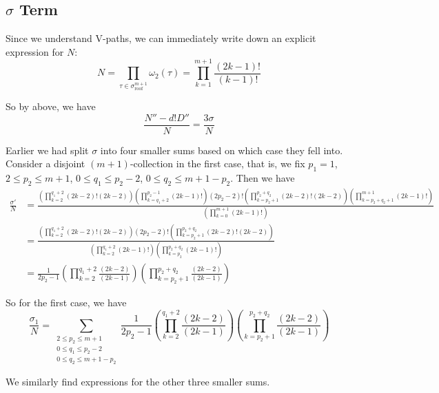 \documentclass[11pt]{article}
\theoremstyle{definition}
\theoremstyle{definition}
\theoremstyle{plain}
\theoremstyle{plain}
\theoremstyle{plain}
\theoremstyle{definition}
\begin{document}
\subsection{$\sigma$ Term}

Since we understand V-paths, we can immediately write down an explicit expression for $N$:
\begin{equation*}
N = \prod\limits_{\tau\in\sigma_{\text{roof}}^{m+1}}\omega_2(\tau) = \prod\limits_{k=1}^{m+1}\frac{(2k-1)!}{(k-1)!}
\end{equation*}

So by above, we have
\begin{equation*}
\frac{N''-d!D''}{N} = \frac{3\sigma}{N}
\end{equation*}

Earlier we had split $\sigma$ into four smaller sums based on which case they fell into. Consider a disjoint $(m+1)$-collection in the first case, that is, we fix $p_1 = 1$, $2\leq p_2\leq m+1$, $0\leq q_1\leq p_2 - 2$, $0\leq q_2 \leq m+1-p_2$. Then we have
\begin{align*}
\frac{\sigma'}{N} &= \frac{\left(\prod\limits_{k=2}^{q_1+2}(2k-2)!(2k-2)\right)\left(\prod\limits_{k=q_1+2}^{p_2-1}(2k-1)!\right)(2p_2-2)!\left(\prod\limits_{k=p_2+1}^{p_2+q_2}(2k-2)!(2k-2)\right)\left(\prod\limits_{k=p_2+q_2+1}^{m+1}(2k-1)!\right)}{\left(\prod\limits_{k=0}^{m+1}(2k-1)!\right)} \\
&= \frac{\left(\prod\limits_{k=2}^{q_1+2}(2k-2)!(2k-2)\right)(2p_2-2)!\left(\prod\limits_{k=p_2+1}^{p_2+q_2}(2k-2)!(2k-2)\right)}{\left(\prod\limits_{k=2}^{q_1+2}(2k-1)!\right)\left(\prod\limits_{k=p_2}^{p_2+q_2}(2k-1)!\right)} \\
&= \frac{1}{2p_2-1}\left(\prod\limits_{k=2}^{q_1+2}\frac{(2k-2)}{(2k-1)}\right)\left(\prod\limits_{k=p_2+1}^{p_2+q_2}\frac{(2k-2)}{(2k-1)}\right)
\end{align*}

So for the first case, we have
\begin{equation*}
\frac{\sigma_1}{N} = \sum\limits_{\substack{2\leq p_2\leq m+1 \\ 0\leq q_1 \leq p_2-2 \\ 0\leq q_2 \leq m+1-p_2}}\frac{1}{2p_2-1}\left(\prod\limits_{k=2}^{q_1+2}\frac{(2k-2)}{(2k-1)}\right)\left(\prod\limits_{k=p_2+1}^{p_2+q_2}\frac{(2k-2)}{(2k-1)}\right)
\end{equation*}

We similarly find expressions for the other three smaller sums.
\end{document}
